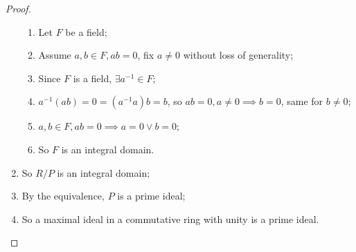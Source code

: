 \documentclass{article}
\begin{document}
\begin{proof}
\begin{enumerate}
\begin{enumerate}
            \item Let $F$ be a field;
            \item Assume $a,b\in F, ab=0$, fix $a\ne0$ without loss of generality;
            \item Since $F$ is a field, $\exists a^{-1}\in F$;
            \item $a^{-1}(ab)=0=(a^{-1}a)b=b$, so $ab=0, a\ne 0\implies b=0$, same for $b\ne0$;
            \item $a,b\in F,ab=0\implies a=0\lor b=0$;
            \item So $F$ is an integral domain.
        \end{enumerate}
        \item So $R/P$ is an integral domain;
        \item By the equivalence, $P$ is a prime ideal;
        \item So a maximal ideal in a commutative ring with unity is a prime ideal.
    \end{enumerate}
\end{proof}
\end{document}
